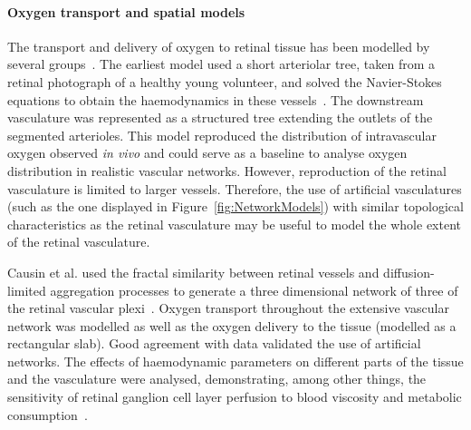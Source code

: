 \documentclass{article}
\begin{document}
\paragraph*{Oxygen transport and spatial models}

The transport and delivery of oxygen to retinal tissue has been modelled by several groups~\cite{Aquah_et_al_2021,Causin_2015,Liu_2009}.
The earliest model used a short arteriolar tree, taken from a retinal photograph of a healthy young volunteer, and solved the Navier-Stokes equations to obtain the haemodynamics in these vessels~\cite{Liu_2009}.
The downstream vasculature was represented as a structured tree extending the outlets of the segmented arterioles.
This model reproduced the distribution of intravascular oxygen observed \textit{in vivo} and could serve as a baseline to analyse oxygen distribution in realistic vascular networks.
However, reproduction of the retinal vasculature is limited to larger vessels.
Therefore, the use of artificial vasculatures (such as the one displayed in Figure~\ref{fig:NetworkModels}) with similar topological characteristics as the retinal vasculature may be useful to model the whole extent of the retinal vasculature.

Causin et al. used the fractal similarity between retinal vessels and diffusion-limited aggregation processes to generate a three dimensional network of three of the retinal vascular plexi~\cite{Causin_2015}.
Oxygen transport throughout the extensive vascular network was modelled as well as the oxygen delivery to the tissue (modelled as a rectangular slab).
Good agreement with data validated the use of artificial networks.
The effects of haemodynamic parameters on different parts of the tissue and the vasculature were analysed, demonstrating, among other things, the sensitivity of retinal ganglion cell layer perfusion to blood viscosity and metabolic consumption~\cite{Causin_2015}.
\end{document}
